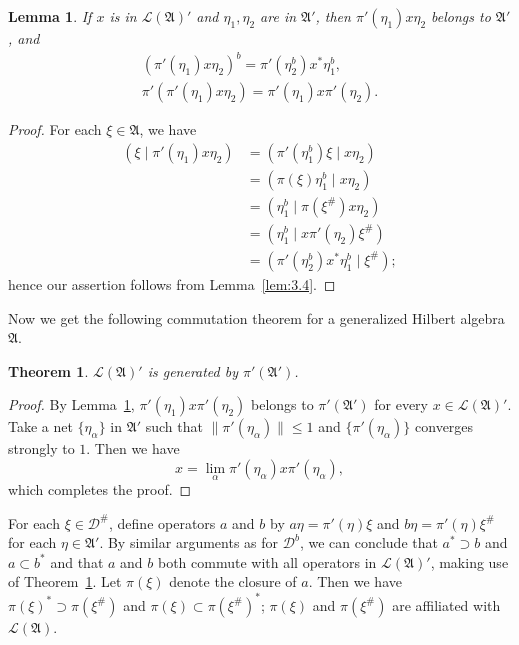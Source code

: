 \documentclass[12pt,b5paper,twoside]{article}
\theoremstyle{takesaki}
\newtheorem{theorem}{Theorem}[section]
\newtheorem{lemma}{Lemma}[section]
\numberwithin{equation}{section}
\begin{document}
\begin{lemma}\label{lem:3.5}
If $x$ is in $\mathcal L(\mathfrak A)'$ and $\eta_1,\eta_2$ are in
$\mathfrak A'$, then $\pi'(\eta_1)x\eta_2$ belongs to $\mathfrak A'$,
and
\begin{equation}
 \begin{gathered}
  (\pi'(\eta_1)x\eta_2)^b=\pi'(\eta_2^b)x^*\eta_1^b,\\
  \pi'(\pi'(\eta_1)x\eta_2)=\pi'(\eta_1)x\pi'(\eta_2).
 \end{gathered}
 \tag{3.9}\label{eq:3.9}
\end{equation}
\end{lemma}

\begin{proof}
For each $\xi\in\mathfrak A$, we have
\begin{align*}
 (\xi\mid\pi'(\eta_1)x\eta_2)
  &=(\pi'(\eta_1^b)\xi\mid x\eta_2)\\
  &=(\pi(\xi)\eta_1^b\mid x\eta_2)\\
  &=(\eta_1^b\mid\pi(\xi^\#)x\eta_2)\\
  &=(\eta_1^b\mid x\pi'(\eta_2)\xi^\#)\\
  &=(\pi'(\eta_2^b)x^*\eta_1^b\mid\xi^\#);
\end{align*}
hence our assertion follows from Lemma~\ref{lem:3.4}.
\end{proof}

Now we get the following commutation theorem for a generalized Hilbert
algebra $\mathfrak A$.

\begin{theorem}\label{thm:3.1}
$\mathcal L(\mathfrak A)'$ is generated by $\pi'(\mathfrak A')$.
\end{theorem}

\begin{proof}
By Lemma~\ref{lem:3.5},
$\pi'(\eta_1)x\pi'(\eta_2)$ belongs to $\pi'(\mathfrak A')$ for every
$x\in\mathcal L(\mathfrak A)'$.  Take a net $\{\eta_\alpha\}$ in
$\mathfrak A'$ such that $\|\pi'(\eta_\alpha)\|\leq1$ and
$\{\pi'(\eta_\alpha)\}$ converges strongly to $1$.  Then we have
\[
 x=\lim_\alpha\pi'(\eta_\alpha)x\pi'(\eta_\alpha),
\]
which completes the proof.
\end{proof}

For each $\xi\in\mathcal D^\#$, define operators $a$ and $b$ by
$a\eta=\pi'(\eta)\xi$
and $b\eta=\pi'(\eta)\xi^\#$ for each $\eta\in\mathfrak A'$.  By
similar arguments as for $\mathcal D^b$, we can conclude that
$a^*\supset b$ and $a\subset b^*$ and that $a$ and $b$ both commute
with all operators in $\mathcal L(\mathfrak A)'$, making use of
Theorem~\ref{thm:3.1}.  Let $\pi(\xi)$ denote the closure of $a$.  Then
we have $\pi(\xi)^*\supset\pi(\xi^\#)$ and
$\pi(\xi)\subset\pi(\xi^\#)^*$; $\pi(\xi)$ and $\pi(\xi^\#)$ are
affiliated with $\mathcal L(\mathfrak A)$.
\end{document}
